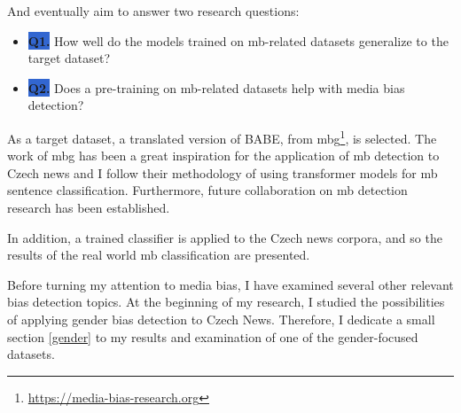\noindent And eventually aim to answer two research questions:
\begin{itemize}
    \item[] \colorbox{highlight}{\textbf{Q1.}\label{Q1}} How well do the models trained on \gls{mb}-related datasets generalize to the target dataset?
    \item[] \colorbox{highlight}{\textbf{Q2.}\label{Q2}} Does a pre-training on \gls{mb}-related datasets help with media bias detection?
\end{itemize}

As a target dataset, a translated version of BABE, from \gls{mbg}\footnote{\url{https://media-bias-research.org}}, is selected. The work of \gls{mbg} has been a great inspiration for the application of \gls{mb} detection to Czech news and I follow their methodology of using transformer models for \gls{mb} sentence classification. Furthermore, future collaboration on \gls{mb} detection research has been established.

In addition, a trained classifier is applied to the Czech news corpora, and so the results of the real world \gls{mb} classification are presented.

Before turning my attention to media bias, I have examined several other relevant bias detection topics. At the beginning of my research, I studied the possibilities of applying gender bias detection to Czech News. Therefore, I dedicate a small section \ref{gender} to my results and examination of one of the gender-focused datasets.

\let\cleardoublepage\clearpage